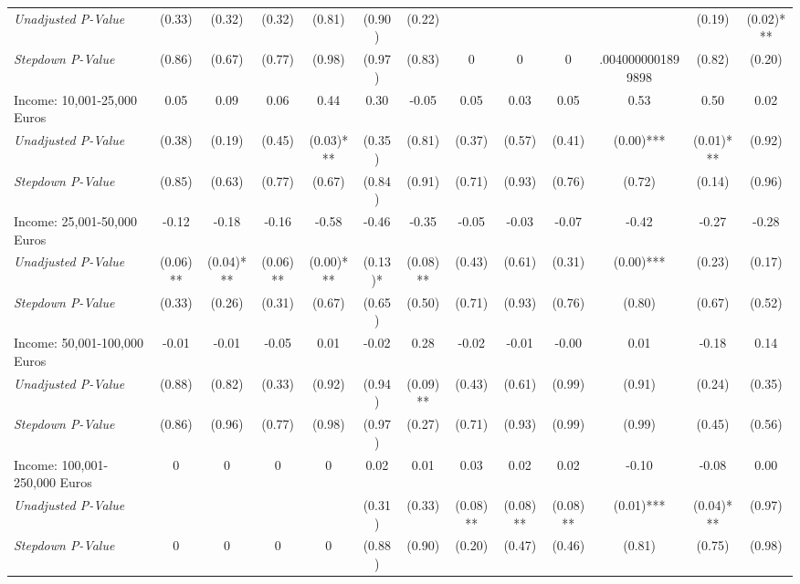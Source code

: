 \begin{tabular}{l c c c c c c c c c c c c}
\quad \textit{Unadjusted P-Value} & (0.33) & (0.32) & (0.32) & (0.81) & (0.90) & (0.22) & & & & & (0.19) & (0.02)*** \\
\quad \textit{Stepdown P-Value} & (0.86) & (0.67) & (0.77) & (0.98) & (0.97) & (0.83) & 0 & 0 & 0 & .0040000001899898 & (0.82) & (0.20) \\
Income: 10,001-25,000 Euros & 0.05 & 0.09 & 0.06 & 0.44 & 0.30 & -0.05 & 0.05 & 0.03 & 0.05 & 0.53 & 0.50 & 0.02 \\
\quad \textit{Unadjusted P-Value} & (0.38) & (0.19) & (0.45) & (0.03)*** & (0.35) & (0.81) & (0.37) & (0.57) & (0.41) & (0.00)*** & (0.01)*** & (0.92) \\
\quad \textit{Stepdown P-Value} & (0.85) & (0.63) & (0.77) & (0.67) & (0.84) & (0.91) & (0.71) & (0.93) & (0.76) & (0.72) & (0.14) & (0.96) \\
Income: 25,001-50,000 Euros & -0.12 & -0.18 & -0.16 & -0.58 & -0.46 & -0.35 & -0.05 & -0.03 & -0.07 & -0.42 & -0.27 & -0.28 \\
\quad \textit{Unadjusted P-Value} & (0.06)** & (0.04)*** & (0.06)** & (0.00)*** & (0.13)* & (0.08)** & (0.43) & (0.61) & (0.31) & (0.00)*** & (0.23) & (0.17) \\
\quad \textit{Stepdown P-Value} & (0.33) & (0.26) & (0.31) & (0.67) & (0.65) & (0.50) & (0.71) & (0.93) & (0.76) & (0.80) & (0.67) & (0.52) \\
Income: 50,001-100,000 Euros & -0.01 & -0.01 & -0.05 & 0.01 & -0.02 & 0.28 & -0.02 & -0.01 & -0.00 & 0.01 & -0.18 & 0.14 \\
\quad \textit{Unadjusted P-Value} & (0.88) & (0.82) & (0.33) & (0.92) & (0.94) & (0.09)** & (0.43) & (0.61) & (0.99) & (0.91) & (0.24) & (0.35) \\
\quad \textit{Stepdown P-Value} & (0.86) & (0.96) & (0.77) & (0.98) & (0.97) & (0.27) & (0.71) & (0.93) & (0.99) & (0.99) & (0.45) & (0.56) \\
Income: 100,001-250,000 Euros & 0 & 0 & 0 & 0 & 0.02 & 0.01 & 0.03 & 0.02 & 0.02 & -0.10 & -0.08 & 0.00 \\
\quad \textit{Unadjusted P-Value} & & & & & (0.31) & (0.33) & (0.08)** & (0.08)** & (0.08)** & (0.01)*** & (0.04)*** & (0.97) \\
\quad \textit{Stepdown P-Value} & 0 & 0 & 0 & 0 & (0.88) & (0.90) & (0.20) & (0.47) & (0.46) & (0.81) & (0.75) & (0.98) \\
\bottomrule
\end{tabular}
